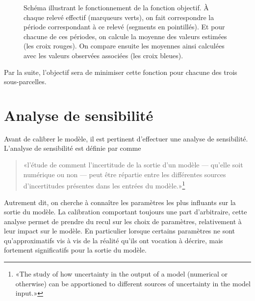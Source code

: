 \begin{figure}[ht]
\caption{Schéma illustrant le fonctionnement de la fonction objectif. À chaque relevé effectif (marqueurs verts), on fait correspondre la période correspondant à ce relevé (segments en pointillés).
Et pour chacune de ces périodes, on calcule la moyenne des valeurs estimées (les croix rouges). On compare ensuite les moyennes ainsi calculées avec les valeurs observées associées (les croix bleues).}
\label{fig:calib}
\end{figure}


Par la suite, l'objectif sera de minimiser cette fonction pour chacune des trois sous-parcelles.

\section{Analyse de sensibilité}

Avant de calibrer le modèle, il est pertinent d'effectuer une analyse de sensibilité.
L'analyse de sensibilité est définie par \citet{saltelli2004} comme
\begin{quote}
 «l'étude de comment l'incertitude de la sortie d'un modèle --- qu'elle soit numérique ou non --- peut être répartie entre les différentes sources d'incertitudes présentes dans les entrées du modèle.»\footnote{«The study of how uncertainty in the output of a model (numerical or otherwise) can be apportioned to different sources of uncertainty in the model input.»}
\end{quote}
Autrement dit, on cherche à connaître les paramètres les plus influants sur la sortie du modèle.
La calibration comportant toujours une part d'arbitraire, cette analyse permet de prendre du recul sur les choix de paramètres, relativement à leur impact sur le modèle.
En particulier lorsque certains paramètres ne sont qu'approximatifs vis à vis de la réalité qu'ils ont vocation à décrire, mais fortement significatifs pour la sortie du modèle.


